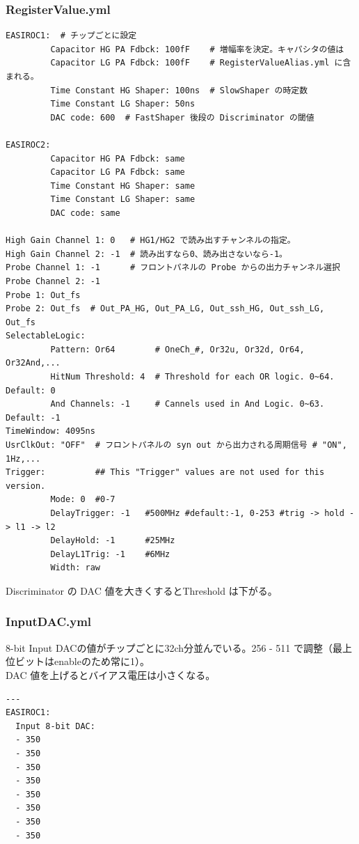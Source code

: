 \subsubsection{RegisterValue.yml}

\begin{shadebox}
\begin{verbatim}
EASIROC1:  # チップごとに設定
         Capacitor HG PA Fdbck: 100fF    # 増幅率を決定。キャパシタの値は
         Capacitor LG PA Fdbck: 100fF    # RegisterValueAlias.yml に含まれる。
         Time Constant HG Shaper: 100ns  # SlowShaper の時定数
         Time Constant LG Shaper: 50ns
         DAC code: 600  # FastShaper 後段の Discriminator の閾値
 
EASIROC2:
         Capacitor HG PA Fdbck: same
         Capacitor LG PA Fdbck: same
         Time Constant HG Shaper: same
         Time Constant LG Shaper: same
         DAC code: same
 
High Gain Channel 1: 0   # HG1/HG2 で読み出すチャンネルの指定。
High Gain Channel 2: -1  # 読み出すなら0、読み出さないなら-1。
Probe Channel 1: -1      # フロントパネルの Probe からの出力チャンネル選択
Probe Channel 2: -1
Probe 1: Out_fs
Probe 2: Out_fs  # Out_PA_HG, Out_PA_LG, Out_ssh_HG, Out_ssh_LG, Out_fs
SelectableLogic:
         Pattern: Or64        # OneCh_#, Or32u, Or32d, Or64, Or32And,...
         HitNum Threshold: 4  # Threshold for each OR logic. 0~64. Default: 0
         And Channels: -1     # Cannels used in And Logic. 0~63. Default: -1
TimeWindow: 4095ns
UsrClkOut: "OFF"  # フロントパネルの syn out から出力される周期信号 # "ON", 1Hz,...
Trigger:          ## This "Trigger" values are not used for this version.
         Mode: 0  #0-7
         DelayTrigger: -1   #500MHz #default:-1, 0-253 #trig -> hold -> l1 -> l2
         DelayHold: -1      #25MHz
         DelayL1Trig: -1    #6MHz
         Width: raw
\end{verbatim}
\end{shadebox}
Discriminator の DAC 値を大きくするとThreshold は下がる。

\subsubsection{InputDAC.yml}
8-bit Input DACの値がチップごとに32ch分並んでいる。256 - 511 で調整（最上位ビットはenableのため常に1）。\\
DAC 値を上げるとバイアス電圧は小さくなる。
\begin{shadebox}
\begin{verbatim}
---
EASIROC1:
  Input 8-bit DAC:
  - 350
  - 350
  - 350
  - 350
  - 350
  - 350
  - 350
  - 350
\end{verbatim}
\end{shadebox}

